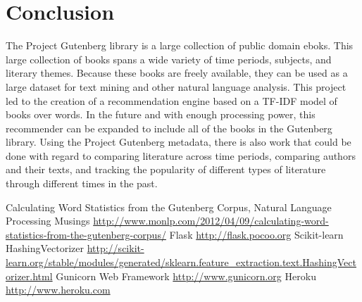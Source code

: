 \documentclass[10pt]{report}
\begin{document}
\section*{Conclusion}
The Project Gutenberg library is a large collection of public domain eboks. This large collection of books spans a wide variety of time periods, subjects, and literary themes. Because these books are freely available, they can be used as a large dataset for text mining and other natural language analysis. This project led to the creation of a recommendation engine based on a TF-IDF model of books over words. In the future and with enough processing power, this recommender can be expanded to include all of the books in the Gutenberg library. Using the Project Gutenberg metadata, there is also work that could be done with regard to comparing literature across time periods, comparing authors and their texts, and tracking the popularity of different types of literature through different times in the past. 

\begin{thebibliography}{9}
Calculating Word Statistics from the Gutenberg Corpus, Natural Language Processing Musings \url{http://www.monlp.com/2012/04/09/calculating-word-statistics-from-the-gutenberg-corpus/}
Flask \url{http://flask.pocoo.org}
Scikit-learn HashingVectorizer \url{http://scikit-learn.org/stable/modules/generated/sklearn.feature_extraction.text.HashingVectorizer.html}
Gunicorn Web Framework \url{http://www.gunicorn.org}
Heroku \url{http://www.heroku.com}
\end{thebibliography}
\end{document}
